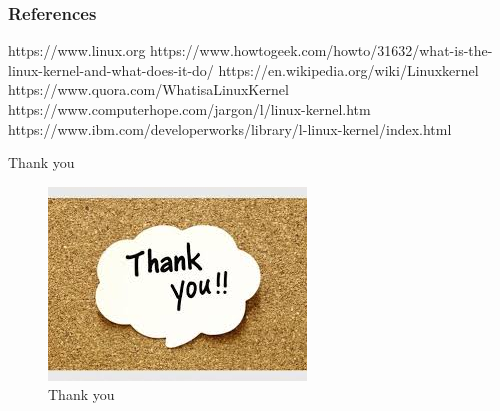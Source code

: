 \documentclass{beamer}
\begin{document}
\begin{frame}[allowframebreaks] %

\frametitle{References}
\begin{thebibliography}{}
\bibitem{}https://www.linux.org
\bibitem{}https://www.howtogeek.com/howto/31632/what-is-the-linux-kernel-and-what-does-it-do/
\bibitem{}https://en.wikipedia.org/wiki/Linuxkernel
\bibitem{}https://www.quora.com/WhatisaLinuxKernel
\bibitem{}https://www.computerhope.com/jargon/l/linux-kernel.htm
\bibitem{}https://www.ibm.com/developerworks/library/l-linux-kernel/index.html

\end{thebibliography}
\end{frame}

\begin{frame}{Thank you}
\begin{figure}
    \centering
    \includegraphics{thankyou.jpg}
    \caption{Thank you}
    \label{fig:my_label}
\end{figure}

\end{frame}
\end{document}
